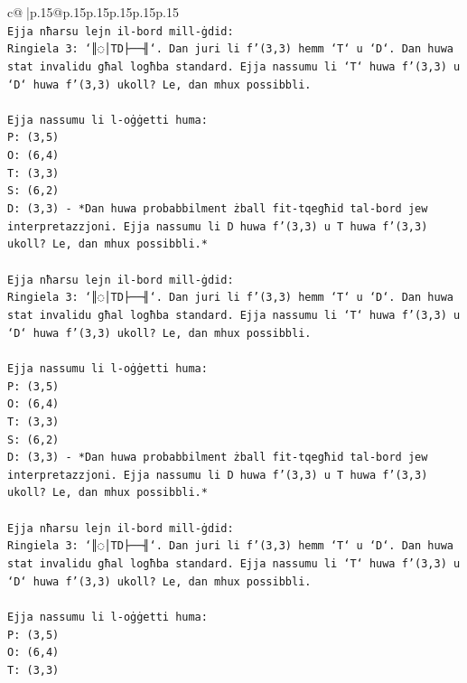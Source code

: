 \documentclass{article}
\begin{document}
{\begin{supertabular}{c@{$\;$}|p{.15\linewidth}@{}p{.15\linewidth}p{.15\linewidth}p{.15\linewidth}p{.15\linewidth}p{.15\linewidth}}
{{{\\ 
\texttt{Ejja nħarsu lejn il{-}bord mill{-}ġdid:} \\
\texttt{Ringiela 3: `║◌│TD├──╢`. Dan juri li f'(3,3) hemm `T` u `D`. Dan huwa stat invalidu għal logħba standard. Ejja nassumu li `T` huwa f'(3,3) u `D` huwa f'(3,3) ukoll? Le, dan mhux possibbli.} \\
\\ 
\texttt{Ejja nassumu li l{-}oġġetti huma:} \\
\texttt{P: (3,5)} \\
\texttt{O: (6,4)} \\
\texttt{T: (3,3)} \\
\texttt{S: (6,2)} \\
\texttt{D: (3,3) {-} *Dan huwa probabbilment żball fit{-}tqegħid tal{-}bord jew interpretazzjoni. Ejja nassumu li D huwa f'(3,3) u T huwa f'(3,3) ukoll? Le, dan mhux possibbli.*} \\
\\ 
\texttt{Ejja nħarsu lejn il{-}bord mill{-}ġdid:} \\
\texttt{Ringiela 3: `║◌│TD├──╢`. Dan juri li f'(3,3) hemm `T` u `D`. Dan huwa stat invalidu għal logħba standard. Ejja nassumu li `T` huwa f'(3,3) u `D` huwa f'(3,3) ukoll? Le, dan mhux possibbli.} \\
\\ 
\texttt{Ejja nassumu li l{-}oġġetti huma:} \\
\texttt{P: (3,5)} \\
\texttt{O: (6,4)} \\
\texttt{T: (3,3)} \\
\texttt{S: (6,2)} \\
\texttt{D: (3,3) {-} *Dan huwa probabbilment żball fit{-}tqegħid tal{-}bord jew interpretazzjoni. Ejja nassumu li D huwa f'(3,3) u T huwa f'(3,3) ukoll? Le, dan mhux possibbli.*} \\
\\ 
\texttt{Ejja nħarsu lejn il{-}bord mill{-}ġdid:} \\
\texttt{Ringiela 3: `║◌│TD├──╢`. Dan juri li f'(3,3) hemm `T` u `D`. Dan huwa stat invalidu għal logħba standard. Ejja nassumu li `T` huwa f'(3,3) u `D` huwa f'(3,3) ukoll? Le, dan mhux possibbli.} \\
\\ 
\texttt{Ejja nassumu li l{-}oġġetti huma:} \\
\texttt{P: (3,5)} \\
\texttt{O: (6,4)} \\
\texttt{T: (3,3)} \\
}}}
\end{supertabular}}
\end{document}
